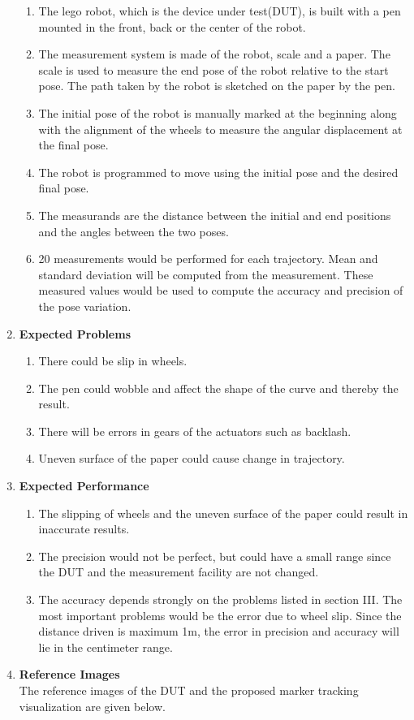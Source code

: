 \documentclass[10pt,a4paper]{article}
\begin{document}
\begin{enumerate}[label=\Roman*]
\begin{enumerate}
	\item
	The lego robot, which is the device under test(DUT), is built with a pen mounted in the front, back or the center of the robot.
	\item
	The measurement system is made of the robot, scale and a paper. The scale is used to measure the end pose of the robot relative to the start pose. The path taken by the robot is sketched on the paper by the pen.
	\item
	The initial pose of the robot is manually marked at the beginning along with the alignment of the wheels to measure the angular displacement at the final pose.
	\item
	The robot is programmed to move using the initial pose and the desired final pose.
	\item
	The measurands are the distance between the initial and end positions and the angles between the two poses.
	\item
	20 measurements would be performed for each trajectory. Mean and standard deviation will be computed from the measurement. These measured values would be used to compute the accuracy and precision of the pose variation. 
\end{enumerate}
\vspace{0.5cm}
\item
\textbf{Expected Problems}\\
\begin{enumerate}
	\item
	There could be slip in wheels.
	\item
	The pen could wobble and affect the shape of the curve and thereby the result.
	\item
	There will be errors in gears of the actuators such as backlash.
	\item
	Uneven surface of the paper could cause change in trajectory.
\end{enumerate}
\newpage	
\item
\textbf{Expected Performance}\\
\begin{enumerate}
	\item
	The slipping of wheels and the uneven surface of the paper could result in inaccurate results.
	\item
	The precision would not be perfect, but could have a small range since the DUT and the measurement facility are not changed.
	\item
	The accuracy depends strongly on the problems listed in section III. The most important problems would be the error due to wheel slip. Since the distance driven is maximum 1m, the error in precision and accuracy will lie in the centimeter range.
\end{enumerate}

\item
\vspace{0.5cm}
\textbf{Reference Images}\\

The reference images of the DUT and the proposed marker tracking visualization are given below.
	

\end{enumerate}	
\end{document}
